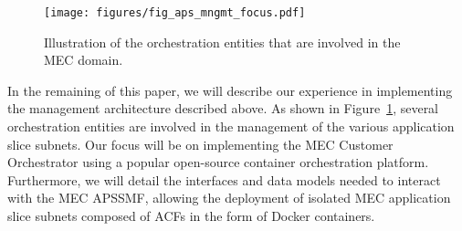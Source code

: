 
%
\begin{figure}[th]
\centering
\texttt{[image: figures/fig\_aps\_mngmt\_focus.pdf]}
\caption{Illustration of the orchestration entities that are involved in the MEC domain.}
\label{fig:ps_mngmt_focus}
\vspace{-0.2cm}
\end{figure}
%
In the remaining of this paper, we will describe our experience in implementing the management architecture described above. As shown in Figure~\ref{fig:ps_mngmt_focus}, several orchestration entities are involved in the management of the various application slice subnets. Our focus will be on implementing the MEC Customer Orchestrator using a popular open-source container orchestration platform. Furthermore, we will detail the interfaces and data models needed to interact with the MEC APSSMF, allowing the deployment of isolated MEC application slice subnets composed of ACFs in the form of Docker containers.  

